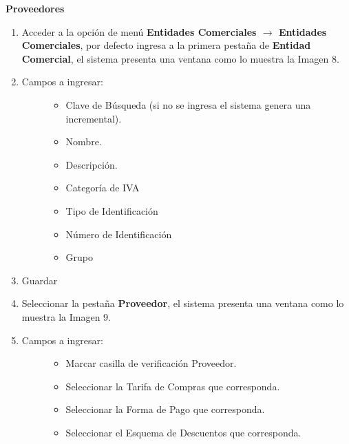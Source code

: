 \documentclass[letterpaper,10pt,spanish]{sphinxmanual}
\begin{document}
\textbf{Proveedores}
\begin{enumerate}
\item {} 
Acceder a la opción de menú \textbf{Entidades Comerciales \(\rightarrow\) Entidades Comerciales}, por defecto ingresa a la primera pestaña de \textbf{Entidad Comercial}, el sistema presenta una ventana como lo muestra la Imagen 8.

\item {} \begin{description}
\item[{Campos a ingresar:}] \leavevmode\begin{itemize}
\item {} 
Clave de Búsqueda (si no se ingresa el sistema genera una incremental).

\item {} 
Nombre.

\item {} 
Descripción.

\item {} 
Categoría de IVA

\item {} 
Tipo de Identificación

\item {} 
Número de Identificación

\item {} 
Grupo

\end{itemize}

\end{description}

\item {} 
Guardar

\item {} 
Seleccionar la pestaña \textbf{Proveedor}, el sistema presenta una ventana como lo muestra la Imagen 9.

\item {} \begin{description}
\item[{Campos a ingresar:}] \leavevmode\begin{itemize}
\item {} 
Marcar casilla de verificación Proveedor.

\item {} 
Seleccionar la Tarifa de Compras que corresponda.

\item {} 
Seleccionar la Forma de Pago que corresponda.

\item {} 
Seleccionar el Esquema de Descuentos que corresponda.


\end{itemize}
\end{description}
\end{enumerate}
\end{document}
